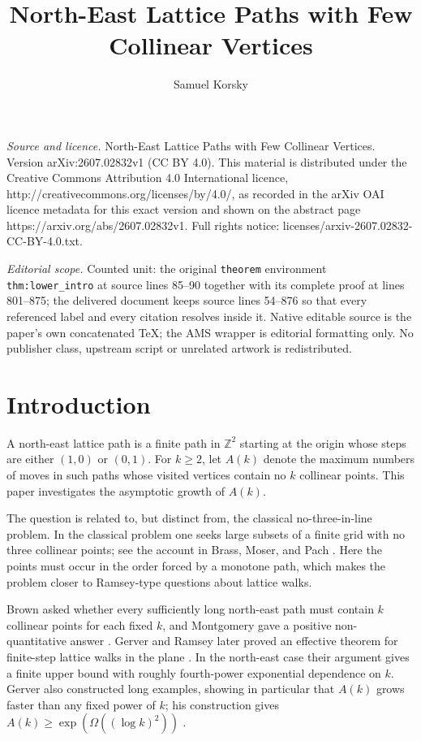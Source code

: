 \documentclass[10pt,a4paper]{amsart}
\newcommand{\Z}{\mathbb Z}
\newcommand{\1}{\mathbf 1}
\begin{document}
\title[North-East Lattice Paths with Few Collinear Vertices]{North-East Lattice Paths with Few Collinear Vertices}
\author{Samuel Korsky}
\date{}
\maketitle
\noindent\emph{Source and licence.} North-East Lattice Paths with Few Collinear Vertices. Version arXiv:2607.02832v1 (CC BY 4.0). This material is distributed under the Creative Commons Attribution 4.0 International licence, http://creativecommons.org/licenses/by/4.0/, as recorded in the arXiv OAI licence metadata for this exact version and shown on the abstract page https://arxiv.org/abs/2607.02832v1. Full rights notice: licenses/arxiv-2607.02832-CC-BY-4.0.txt.\par\smallskip
\noindent\textit{Editorial scope.} Counted unit: the original \texttt{theorem} environment \texttt{thm:lower\_intro} at source lines 85--90 together with its complete proof at lines 801--875; the delivered document keeps source lines 54--876 so that every referenced label and every citation resolves inside it. Native editable source is the paper's own concatenated TeX; the AMS wrapper is editorial formatting only. No publisher class, upstream script or unrelated artwork is redistributed.
\section{Introduction}

A north-east lattice path is a finite path in $\Z^2$ starting at the origin whose steps are either $(1,0)$ or $(0,1)$. For $k\ge2$, let $A(k)$ denote the maximum numbers of moves in such paths whose visited vertices contain no $k$ collinear points. This paper investigates the asymptotic growth of $A(k)$.

\bigskip
\noindent
The question is related to, but distinct from, the classical no-three-in-line problem. In the classical problem one seeks large subsets of a finite grid with no three collinear points; see the account in Brass, Moser, and Pach \cite{BMP}. Here the points must occur in the order forced by a monotone path, which makes the problem closer to Ramsey-type questions about lattice walks.

\bigskip
\noindent
Brown asked whether every sufficiently long north-east path must contain $k$ collinear points for each fixed $k$, and Montgomery gave a positive non-quantitative answer \cite{Montgomery}. Gerver and Ramsey later proved an effective theorem for finite-step lattice walks in the plane \cite{GerverRamsey}. In the north-east case their argument gives a finite upper bound with roughly fourth-power exponential dependence on $k$. Gerver also constructed long examples, showing in particular that $A(k)$ grows faster than any fixed power of $k$; his construction gives $A(k)\ge \exp(\Omega((\log k)^2))$ \cite{Gerver}.
\end{document}
